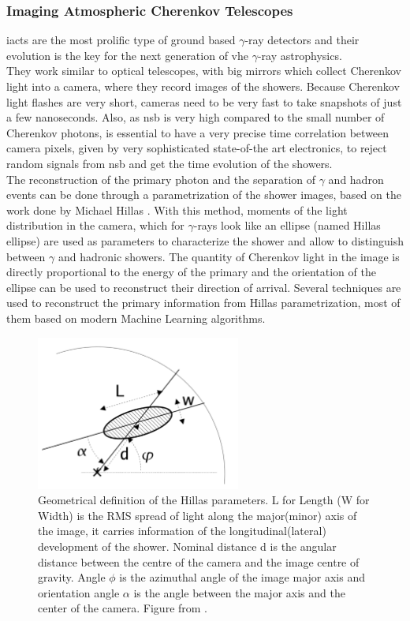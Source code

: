 \documentclass[main.tex]{subfiles}
\begin{document}
\subsubsection{Imaging Atmospheric Cherenkov Telescopes}

\glspl{iact} are the most prolific type of ground based $\gamma$-ray detectors and their evolution is the key for the next generation of \gls{vhe} $\gamma$-ray astrophysics.\\
They work similar to optical telescopes, with big mirrors which collect Cherenkov light into a camera, where they record images of the showers. 
Because Cherenkov light flashes are very short, cameras need to be very fast to take snapshots of just  a few nanoseconds. Also, as \gls{nsb} is very high compared to the small number of Cherenkov photons, is essential to have a very precise time correlation between camera pixels, given by very sophisticated state-of-the art electronics, to reject random signals from \gls{nsb} and get the time evolution of the showers.\\
The reconstruction of the primary photon and the separation of $\gamma$ and hadron events can be done through a parametrization of the shower images, based on the work done by Michael Hillas \cite{1985Hillas}. With this method, moments of the light distribution in the camera, which for $\gamma$-rays look like an ellipse (named Hillas ellipse) are used as parameters to characterize the shower and allow to distinguish between $\gamma$  and hadronic showers. The quantity of Cherenkov light in the image is directly proportional to the energy of the primary and the orientation of the ellipse can be used to reconstruct their direction of arrival. Several techniques are used to reconstruct the primary information from Hillas parametrization, most of them based on modern Machine Learning algorithms.\\

\begin{figure}
    \centering
    \includegraphics[width=0.6\textwidth]{Pictures/Hillaspars.pdf}
    \caption{Geometrical definition of the Hillas parameters. L for Length (W for Width) is the RMS spread of light along the major(minor) axis of the image, it carries information of the longitudinal(lateral) development of the shower. Nominal distance d is the angular distance between the centre of the camera and the image centre of gravity. Angle $\phi$ is the azimuthal angle of the image major axis and orientation angle $\alpha$ is the angle between the major axis and the center of the camera. Figure from \cite{2006analysismethodscherenkovtels}. }
    \label{fig:hillas}
\end{figure}
\end{document}
